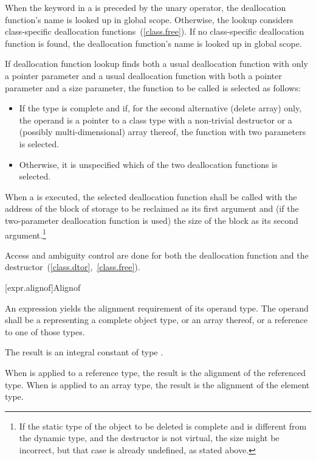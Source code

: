 \pnum
When the keyword  in a  is
preceded by the unary \tcode{::} operator, the deallocation function's name is looked
up in global scope. Otherwise, the lookup considers class-specific deallocation
functions~(\ref{class.free}). If no class-specific deallocation function is found,
the deallocation function's name is looked up in global scope.

\pnum
If deallocation function lookup finds both a usual
deallocation function with only a pointer parameter and a usual deallocation
function with both a pointer parameter and a size parameter,
the function to be called is selected as follows:
\begin{itemize}
\item
If the type is complete and if, for the second alternative (delete
array) only, the operand is a pointer to a class type with a
non-trivial destructor or a (possibly multi-dimensional) array thereof,
the function with two parameters is selected.
\item
Otherwise, it is unspecified which of the two deallocation functions
is selected.
\end{itemize}

\pnum
When a 
is executed, the selected deallocation function shall be called with
the address of the block of storage to be reclaimed as its first argument and
(if the two-parameter deallocation function is used) the size of the block as its
second argument.\footnote{If the static type of the object to be deleted is complete
and is different from the dynamic type, and the destructor is not virtual, the size might
be incorrect, but that case is already undefined, as stated above.}

\pnum
Access and ambiguity control are done for both the deallocation function
and the destructor~(\ref{class.dtor},~\ref{class.free}).

[expr.alignof]{Alignof}

\pnum
{}%
An  expression yields the alignment requirement
of its operand type. The operand shall be a 
representing a complete object type, or an array thereof, or a reference
to one of those types.

\pnum
The result is an integral constant of type
.

\pnum
When  is applied to a reference type, the result
is the alignment of the referenced type. When 
is applied to an array type, the result is the alignment of the
element type.

